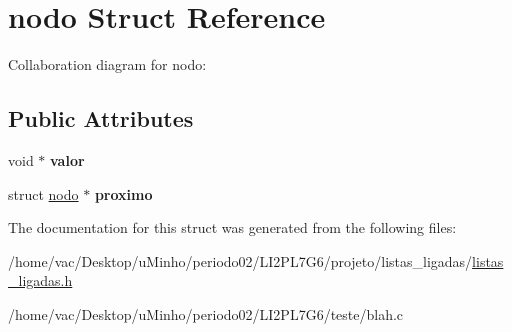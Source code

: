 \hypertarget{structnodo}{}\section{nodo Struct Reference}
\label{structnodo}


Collaboration diagram for nodo\+:
\subsection*{Public Attributes}
\begin{DoxyCompactItemize}
\item 
\mbox{\label{structnodo_a344b5b1cb9597ce38786e9d21bb6f42d}} 
void $\ast$ {\bfseries valor}
\item 
\mbox{\label{structnodo_a89841e92650be541e8bc568a20765e82}} 
struct \hyperlink{structnodo}{nodo} $\ast$ {\bfseries proximo}
\end{DoxyCompactItemize}


The documentation for this struct was generated from the following files\+:\begin{DoxyCompactItemize}
\item 
/home/vac/\+Desktop/u\+Minho/periodo02/\+L\+I2\+P\+L7\+G6/projeto/listas\+\_\+ligadas/\hyperlink{listas__ligadas_8h}{listas\+\_\+ligadas.\+h}\item 
/home/vac/\+Desktop/u\+Minho/periodo02/\+L\+I2\+P\+L7\+G6/teste/blah.\+c\end{DoxyCompactItemize}
